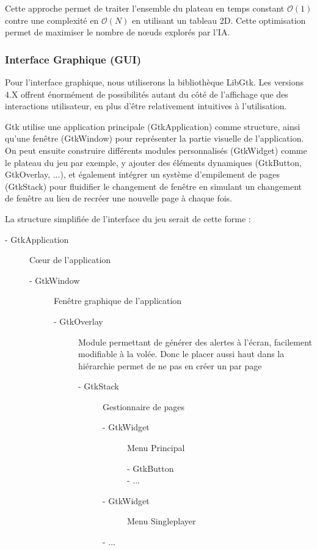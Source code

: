 \documentclass[11pt,a4paper,titlepage,oneside]{article}
\begin{document}
    Cette approche permet de traiter l'ensemble du plateau en temps constant $\mathcal{O}(1)$ contre une complexité en $\mathcal{O}(N)$ en utilisant un tableau 2D. Cette optimisation permet de maximiser le nombre de nœuds explorés par l'IA.


    \subsubsection{Interface Graphique (GUI)}
    Pour l'interface graphique, nous utiliserons la bibliothèque LibGtk. Les versions 4.X offrent énormément de possibilités autant du côté de l'affichage que des interactions utilisateur, en plus d'être relativement intuitives à l'utilisation.

    Gtk utilise une application principale (GtkApplication) comme structure, ainsi qu'une fenêtre (GtkWindow) pour représenter la partie visuelle de l'application. On peut ensuite construire différents modules personnalisés (GtkWidget) comme le plateau du jeu par exemple, y ajouter des éléments dynamiques (GtkButton, GtkOverlay, ...), et également intégrer un système d'empilement de pages (GtkStack) pour fluidifier le changement de fenêtre en simulant un changement de fenêtre au lieu de recréer une nouvelle page à chaque fois.

    La structure simplifiée de l'interface du jeu serait de cette forme :
    
    \begin{description}
        \item[- GtkApplication] Cœur de l'application
        \begin{description}
            \item[- GtkWindow] Fenêtre graphique de l'application
            \begin{description}
                \item[- GtkOverlay] Module permettant de générer des alertes à l'écran, facilement modifiable à la volée. Donc le placer aussi haut dans la hiérarchie permet de ne pas en créer un par page
                \begin{description}
                    \item[- GtkStack] Gestionnaire de pages
                    \begin{description}
                        \item[- GtkWidget] Menu Principal
                        \begin{description}
                            \item[- GtkButton]
                            \item[- ...]
                        \end{description}
                        \item[- GtkWidget] Menu Singleplayer
                        \item[- ...]
                    \end{description}
                \end{description}
            \end{description}
        \end{description}
    \end{description}
\end{document}
